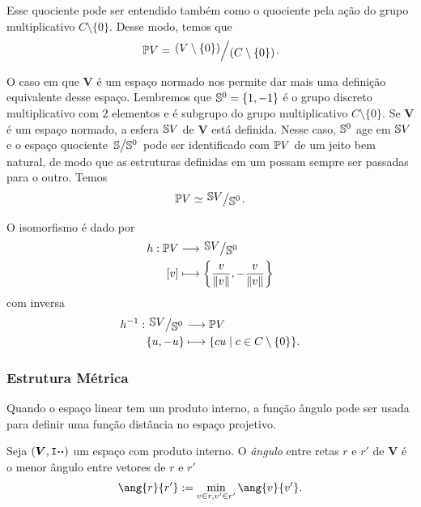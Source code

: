 Esse quociente pode ser entendido também como o quociente pela ação do grupo multiplicativo $C \setminus \{0\}$. Desse modo, temos que
	\begin{equation*}
	\pro V = \quo{\left( V \setminus \{0\} \right)}{(C \setminus \{0\})}.
	\end{equation*}

O caso em que $\bm V$ é um espaço normado nos permite dar mais uma definição equivalente desse espaço. Lembremos que $\S^0 = \{1,-1\}$ é o grupo discreto multiplicativo com $2$ elementos e é subgrupo do grupo multiplicativo $C \setminus \{0\}$. Se $\bm V$ é um espaço normado, a esfera $\S V$ de $\bm V$ está definida. Nesse caso, $\S^0$ age em $\S V$ e o espaço quociente $\quo{\S}{\S^0}$ pode ser identificado com $\pro V$ de um jeito bem natural, de modo que as estruturas definidas em um possam sempre ser passadas para o outro. Temos
	\begin{equation*}
	\pro V \simeq \quo{\S V}{\S^0}.
	\end{equation*}

O isomorfismo é dado por
	\begin{align*}
	\func{h}{\pro V}{\quo{\S V}{\S^0}}{[v]}{\left\{\frac{v}{\nor{v}},-\frac{v}{\nor{v}}\right\}}
	\end{align*}
com inversa
	\begin{align*}
	\func{h\inv}{\quo{\S V}{\S^0}}{\pro V}{\{u,-u\}}{\set{cu}{c \in C \setminus \{0\}}}.
	\end{align*}

\subsubsection{Estrutura Métrica}

Quando o espaço linear tem um produto interno, a função ângulo pode ser usada para definir uma função distância no espaço projetivo.

\begin{defi}
Seja $(\bm V,\inte{\var}{\var})$ um espaço com produto interno. O \emph{ângulo} entre retas $r$ e $r'$ de $\bm V$ é o menor ângulo entre vetores de $r$ e $r'$
	\begin{equation*}
	\ang{r}{r'} := \min_{v \in r, v' \in r'} \ang{v}{v'}.
	\end{equation*}
\end{defi}

